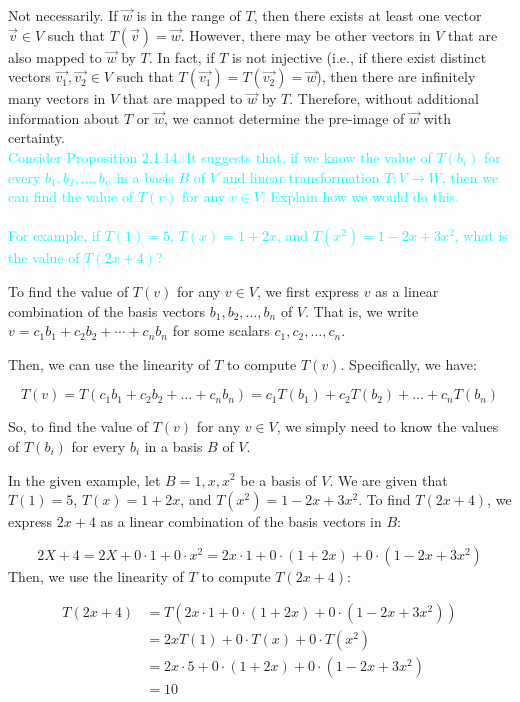 \documentclass[fontsize=12pt]{scrartcl}
\begin{document}
\noindent
Not necessarily. If $\vec{w}$ is in the range of $T$, then there exists at least one vector $\vec{v} \in V$ such that $T(\vec{v})=\vec{w}$. However, there may be other vectors in $V$ that are also mapped to $\vec{w}$ by $T$. In fact, if $T$ is not injective (i.e., if there exist distinct vectors $\vec{v_1}, \vec{v_2} \in V$ such that $T(\vec{v_1})=T(\vec{v_2})=\vec{w}$), then there are infinitely many vectors in $V$ that are mapped to $\vec{w}$ by $T$. Therefore, without additional information about $T$ or $\vec{w}$, we cannot determine the pre-image of $\vec{w}$ with certainty.
\\

\noindent
\textcolor{cyan}{Consider Proposition 2.1.14. It suggests that, if we know the value of $T(b_i)$ for every $b_1, b_2, \ldots , b_n$ in a basis $B$ of $V$ and linear transformation $T:V \to W$, then we can find the value of $T(v)$  for any $v \in V$. Explain how we would do this.}\\
\\
\textcolor{cyan}{For example, if $T(1) = 5$, $T(x) = 1 +2x$, and $T(x^2) = 1 - 2x + 3x^2$, what is the value of $T(2x+4)$?}

\noindent
To find the value of $T(v)$ for any $v \in V$, we first express $v$ as a linear combination of the basis vectors $b_1, b_2, \ldots , b_n$ of $V$. That is, we write $v = c_1 b_1 + c_2 b_2 + \cdots + c_n b_n$ for some scalars $c_1, c_2, \ldots , c_n$.

\noindent
Then, we can use the linearity of $T$ to compute $T(v)$. Specifically, we have:

$$T(v) = T(c_1b_1 + c_2b_2 + \ldots + c_nb_n) = c_1T(b_1) + c_2T(b_2) + \ldots + c_nT(b_n) $$

\noindent
So, to find the value of $T(v)$ for any $v \in V$, we simply need to know the values of $T(b_i)$ for every $b_i$ in a basis $B$ of $V$.

\noindent
In the given example, let $B = {1,x,x^2}$ be a basis of $V$. We are given that $T(1) = 5$, $T(x) = 1+2x$, and $T(x^2) = 1-2x+3x^2$. To find $T(2x+4)$, we express $2x+4$ as a linear combination of the basis vectors in $B$:

$$2X+4 = 2X + 0\cdot 1 + 0 \cdot x^2 = 2x \cdot 1 + 0 \cdot (1+2x) + 0 \cdot (1-2x + 3x^2) $$
Then, we use the linearity of $T$ to compute $T(2x+4)$:

\begin{align*}
T(2x+4) &= T(2x\cdot 1 + 0\cdot(1+2x) + 0\cdot(1-2x+3x^2)) \\
&= 2xT(1) + 0\cdot T(x) + 0\cdot T(x^2) \\
&= 2x\cdot 5 + 0\cdot (1+2x) + 0\cdot (1-2x+3x^2) \\
&= 10
\end{align*}
\end{document}

